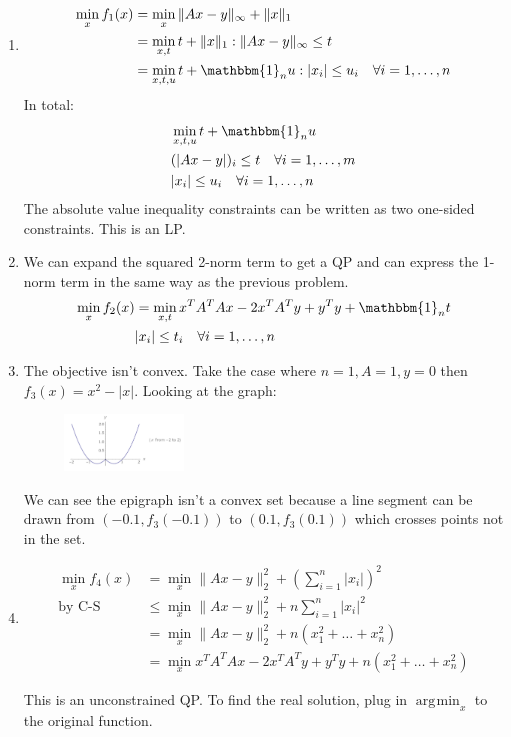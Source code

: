 \documentclass[11pt]{article}
\DeclareMathOperator*{\argmin}{arg\!min}
\begin{document}
\begin{solution}
\begin{enumerate}
    \item \begin{align*}
        \min_{x} f_1(x) &= \min_{x} \|Ax-y\|_\infty + \|x\|_1 \\
        &= \min_{x,t} t + \|x\|_1 : \|Ax-y\|_\infty \leq t \\
        &= \min_{x,t,u} t + \mathbbm{1}_n u : |x_i| \leq u_i \quad \forall i = 1, \dots, n
    \end{align*}
    In total:
    \begin{align*}
        &\min_{x,t,u} t + \mathbbm{1}_n u \\
        &(|A x - y|)_i \leq t \quad \forall i = 1, \dots, m \\
        &|x_i| \leq u_i \quad \forall i = 1, \dots, n
    \end{align*}
    The absolute value inequality constraints can be written as two one-sided constraints. This is an LP.

    \item We can expand the squared 2-norm term to get a QP and can express the 1-norm term in the same way as the previous problem.
    \begin{align*}
        \min_{x} f_2(x) &= \min_{x,t} x^T A^T A x - 2 x^T A^T y + y^T y + \mathbbm{1}_n t \\
        &|x_i| \leq t_i \quad \forall i = 1, \dots, n
    \end{align*}

    \item The objective isn't convex. Take the case where $n = 1, A = 1, y = 0$ then $f_3(x) = x^2 - |x|$. Looking at the graph:
    \begin{figure}[H]
        \centerline{\includegraphics[width=0.3\textwidth]{problem2_plot.png}}
    \end{figure}
    We can see the epigraph isn't a convex set because a line segment can be drawn from $(-0.1, f_3(-0.1))$ to $(0.1, f_3(0.1))$ which crosses points not in the set.

    \item \begin{align*}
        \min_x f_4(x) &= \min_x \|Ax - y\|_2^2 + (\sum_{i=1}^n |x_i|)^2 \\
        \text{by C-S } &\leq \min_x \|Ax - y\|_2^2 + n \sum_{i=1}^n |x_i|^2 \\
        &= \min_x \|Ax-y\|_2^2 + n (x_1^2 + \dots + x_n^2) \\
        &= \min_{x} x^T A^T A x - 2 x^T A^T y + y^T y + n (x_1^2 + \dots + x_n^2)
    \end{align*}

    This is an unconstrained QP. To find the real solution, plug in $\argmin_x$ to the original function.
\end{enumerate}
\end{solution}
\end{document}

